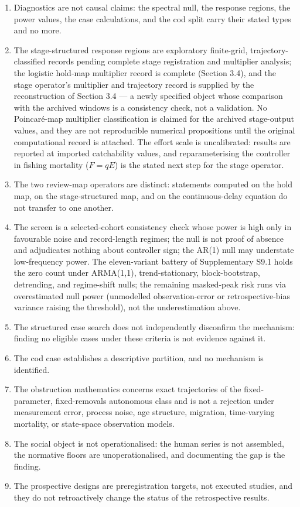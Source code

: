 \documentclass[11pt]{article}
\providecommand{\tightlist}{\setlength{\itemsep}{0pt}\setlength{\parskip}{0pt}}
\begin{document}
\begin{enumerate}
\def\labelenumi{(\roman{enumi})}
\tightlist
\item Diagnostics are not causal claims: the spectral null, the response regions, the power values, the case calculations, and the cod split carry their stated types and no more.
\item The stage-structured response regions are exploratory finite-grid, trajectory-classified records pending complete stage registration and multiplier analysis; the logistic hold-map multiplier record is complete (Section 3.4), and the stage operator's multiplier and trajectory record is supplied by the reconstruction of Section 3.4 --- a newly specified object whose comparison with the archived windows is a consistency check, not a validation. No Poincar\'e-map multiplier classification is claimed for the archived stage-output values, and they are not reproducible numerical propositions until the original computational record is attached. The effort scale is uncalibrated: results are reported at imported catchability values, and reparameterising the controller in fishing mortality (\(F = qE\)) is the stated next step for the stage operator.
\item The two review-map operators are distinct: statements computed on the hold map, on the stage-structured map, and on the continuous-delay equation do not transfer to one another.
\item The screen is a selected-cohort consistency check whose power is high only in favourable noise and record-length regimes; the null is not proof of absence and adjudicates nothing about controller sign; the AR(1) null may understate low-frequency power. The eleven-variant battery of Supplementary S9.1 holds the zero count under ARMA(1,1), trend-stationary, block-bootstrap, detrending, and regime-shift nulls; the remaining masked-peak risk runs via overestimated null power (unmodelled observation-error or retrospective-bias variance raising the threshold), not the underestimation above.
\item The structured case search does not independently disconfirm the mechanism: finding no eligible cases under these criteria is not evidence against it.
\item The cod case establishes a descriptive partition, and no mechanism is identified.
\item The obstruction mathematics concerns exact trajectories of the fixed-parameter, fixed-removals autonomous class and is not a rejection under measurement error, process noise, age structure, migration, time-varying mortality, or state-space observation models.
\item The social object is not operationalised: the human series is not assembled, the normative floors are unoperationalised, and documenting the gap is the finding.
\item The prospective designs are preregistration targets, not executed studies, and they do not retroactively change the status of the retrospective results.
\end{enumerate}
\end{document}
